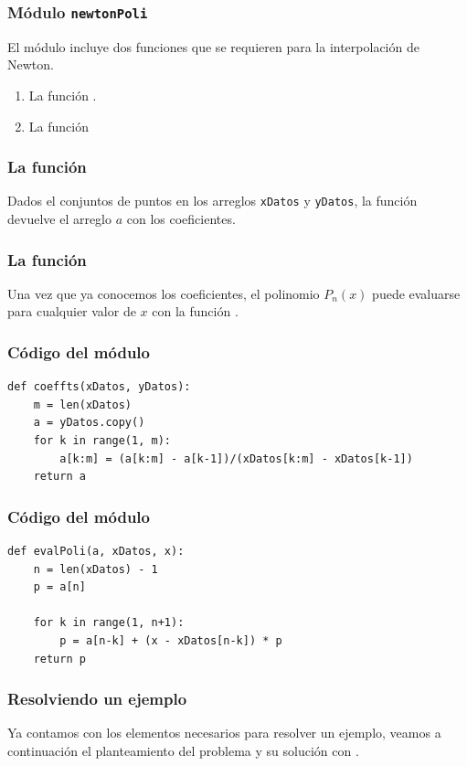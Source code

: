 \documentclass[12pt]{beamer}
\begin{document}
\begin{frame}
\frametitle{Módulo \texttt{newtonPoli}}
El módulo  incluye dos funciones que se requieren para la interpolación de Newton.
\begin{enumerate}[<+->]
\item La función .
\item La función 
\end{enumerate}
\end{frame}
\begin{frame}
\frametitle{La función }
Dados el conjuntos de puntos en los arreglos \texttt{xDatos} y \texttt{yDatos}, la función  devuelve el arreglo $a$ con los coeficientes.
\end{frame}
\begin{frame}
\frametitle{La función }
Una vez que ya conocemos los coeficientes, el polinomio $P_{n}(x)$ puede evaluarse para cualquier valor de $x$ con la función .
\end{frame}
\begin{frame}[fragile]
\frametitle{Código del módulo}
\begin{lstlisting}[caption=Funciones \texttt{coeffts} del módulo \texttt{newtonPoli}]    
def coeffts(xDatos, yDatos):
    m = len(xDatos) 
    a = yDatos.copy()
    for k in range(1, m):
        a[k:m] = (a[k:m] - a[k-1])/(xDatos[k:m] - xDatos[k-1])
    return a
\end{lstlisting}
\end{frame}
\begin{frame}[fragile]
\frametitle{Código del módulo}
\begin{lstlisting}[caption=Funciones \texttt{evalPoli} del módulo \texttt{newtonPoli}]
def evalPoli(a, xDatos, x):
    n = len(xDatos) - 1 
    p = a[n]

    for k in range(1, n+1):
        p = a[n-k] + (x - xDatos[n-k]) * p
    return p
\end{lstlisting}
\end{frame}
\begin{frame}
\frametitle{Resolviendo un ejemplo}
Ya contamos con los elementos necesarios para resolver un ejemplo, veamos a continuación el planteamiento del problema y su solución con \python.
\end{frame}
\end{document}
